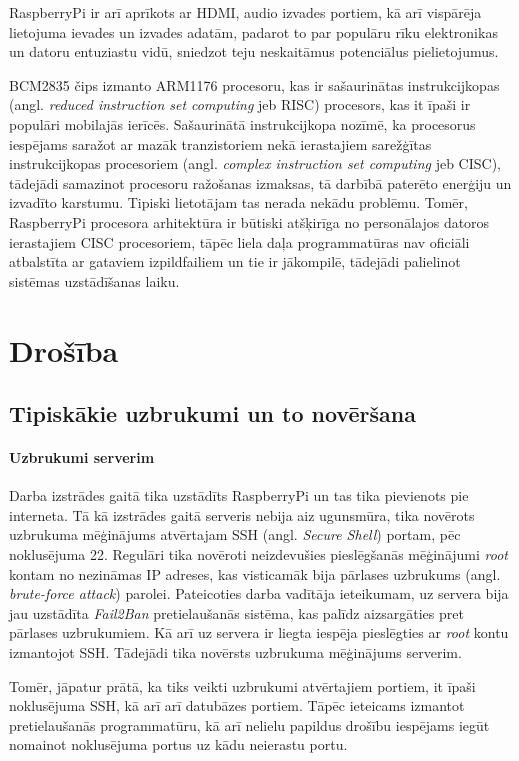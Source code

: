 RaspberryPi ir arī aprīkots ar HDMI, audio izvades portiem, kā arī vispārēja lietojuma ievades un izvades adatām, padarot to par populāru rīku elektronikas un datoru entuziastu vidū, sniedzot teju neskaitāmus potenciālus pielietojumus.

BCM2835 čips izmanto ARM1176 procesoru, kas ir sašaurinātas instrukcijkopas (angl. \textit{reduced instruction set computing} jeb RISC) procesors, kas it īpaši ir populāri mobilajās ierīcēs. Sašaurinātā instrukcijkopa nozīmē, ka procesorus iespējams saražot ar mazāk tranzistoriem nekā ierastajiem sarežģītas instrukcijkopas procesoriem (angl. \textit{complex instruction set computing} jeb CISC), tādejādi samazinot procesoru ražošanas izmaksas, tā darbībā paterēto enerģiju un izvadīto karstumu.
Tipiski lietotājam tas nerada nekādu problēmu. Tomēr, RaspberryPi procesora arhitektūra ir būtiski atšķirīga no personālajos datoros ierastajiem CISC procesoriem, tāpēc liela daļa programmatūras nav oficiāli atbalstīta ar gataviem izpildfailiem un tie ir jākompilē, tādejādi palielinot sistēmas uzstādīšanas laiku.


\chapter{Drošība}

\section{Tipiskākie uzbrukumi un to novēršana}
\subsubsection{Uzbrukumi serverim}
Darba izstrādes gaitā tika uzstādīts RaspberryPi un tas tika pievienots pie interneta. Tā kā izstrādes gaitā serveris nebija aiz ugunsmūra, tika novērots uzbrukuma mēģinājums atvērtajam SSH (angl. \textit{Secure Shell}) portam, pēc noklusējuma 22. Regulāri tika novēroti neizdevušies pieslēgšanās mēģinājumi \textit{root} kontam no nezināmas IP adreses, kas visticamāk bija pārlases uzbrukums (angl. \textit{brute-force attack}) parolei. Pateicoties darba vadītāja ieteikumam, uz servera bija jau uzstādīta \textit{Fail2Ban} pretielaušanās sistēma, kas palīdz aizsargāties pret pārlases uzbrukumiem. Kā arī uz servera ir liegta iespēja pieslēgties ar \textit{root} kontu izmantojot SSH. Tādejādi tika novērsts uzbrukuma mēģinājums serverim.

Tomēr, jāpatur prātā, ka tiks veikti uzbrukumi atvērtajiem portiem, it īpaši noklusējuma SSH, kā arī arī datubāzes portiem. Tāpēc ieteicams izmantot pretielaušanās programmatūru, kā arī nelielu papildus drošību iespējams iegūt nomainot noklusējuma portus uz kādu neierastu portu.

